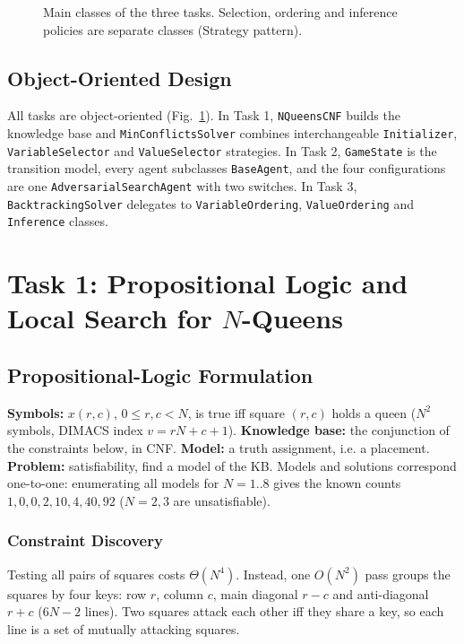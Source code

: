 \documentclass[conference]{IEEEtran}
\begin{document}
\begin{figure}[htbp]
\centering
\resizebox{0.88\textwidth}{!}{}
\caption{Main classes of the three tasks. Selection, ordering and inference policies are separate classes (Strategy pattern).}
\label{fig:uml_arch}
\end{figure}

\subsection{Object-Oriented Design}
All tasks are object-oriented (Fig.~\ref{fig:uml_arch}). In Task 1, \texttt{NQueensCNF} builds the knowledge base and \texttt{MinConflictsSolver} combines interchangeable \texttt{Initializer}, \texttt{VariableSelector} and \texttt{ValueSelector} strategies. In Task 2, \texttt{GameState} is the transition model, every agent subclasses \texttt{BaseAgent}, and the four configurations are one \texttt{AdversarialSearchAgent} with two switches. In Task 3, \texttt{BacktrackingSolver} delegates to \texttt{VariableOrdering}, \texttt{ValueOrdering} and \texttt{Inference} classes.

\section{Task 1: Propositional Logic and Local Search for $N$-Queens}

\subsection{Propositional-Logic Formulation}
\textbf{Symbols:} $x(r,c)$, $0\le r,c<N$, is true iff square $(r,c)$ holds a queen ($N^2$ symbols, DIMACS index $v=rN+c+1$). \textbf{Knowledge base:} the conjunction of the constraints below, in CNF. \textbf{Model:} a truth assignment, i.e. a placement. \textbf{Problem:} satisfiability, find a model of the KB. Models and solutions correspond one-to-one: enumerating all models for $N=1..8$ gives the known counts $1,0,0,2,10,4,40,92$ ($N=2,3$ are unsatisfiable).

\subsubsection{Constraint Discovery}
Testing all pairs of squares costs $\Theta(N^4)$. Instead, one $O(N^2)$ pass groups the squares by four keys: row $r$, column $c$, main diagonal $r-c$ and anti-diagonal $r+c$ ($6N-2$ lines). Two squares attack each other iff they share a key, so each line is a set of mutually attacking squares.
\end{document}
